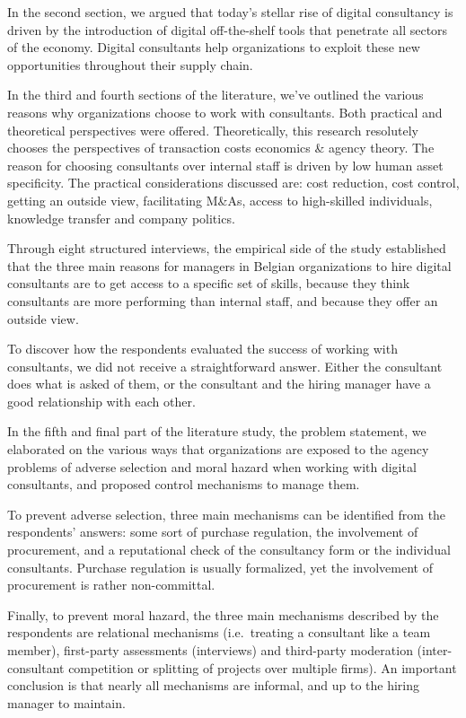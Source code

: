 \documentclass[12pt]{article}
\begin{document}
In the second section, we argued that today's stellar rise of digital
consultancy is driven by the introduction of digital off-the-shelf tools
that penetrate all sectors of the economy. Digital consultants help
organizations to exploit these new opportunities throughout their supply
chain.

In the third and fourth sections of the literature, we've outlined the
various reasons why organizations choose to work with consultants. Both
practical and theoretical perspectives were offered. Theoretically, this
research resolutely chooses the perspectives of transaction costs
economics \& agency theory. The reason for choosing consultants over
internal staff is driven by low human asset specificity. The practical
considerations discussed are: cost reduction, cost control, getting an
outside view, facilitating M\&As, access to high-skilled individuals,
knowledge transfer and company politics.

Through eight structured interviews, the empirical side of the study
established that the three main reasons for managers in Belgian
organizations to hire digital consultants are to get access to a
specific set of skills, because they think consultants are more
performing than internal staff, and because they offer an outside view.

To discover how the respondents evaluated the success of working with
consultants, we did not receive a straightforward answer. Either the
consultant does what is asked of them, or the consultant and the hiring
manager have a good relationship with each other.

In the fifth and final part of the literature study, the problem
statement, we elaborated on the various ways that organizations are
exposed to the agency problems of adverse selection and moral hazard
when working with digital consultants, and proposed control mechanisms
to manage them.

To prevent adverse selection, three main mechanisms can be identified
from the respondents' answers: some sort of purchase regulation, the
involvement of procurement, and a reputational check of the consultancy
form or the individual consultants. Purchase regulation is usually
formalized, yet the involvement of procurement is rather non-committal.

Finally, to prevent moral hazard, the three main mechanisms described by
the respondents are relational mechanisms (i.e.~treating a consultant
like a team member), first-party assessments (interviews) and
third-party moderation (inter-consultant competition or splitting of
projects over multiple firms). An important conclusion is that nearly
all mechanisms are informal, and up to the hiring manager to maintain.
\end{document}
